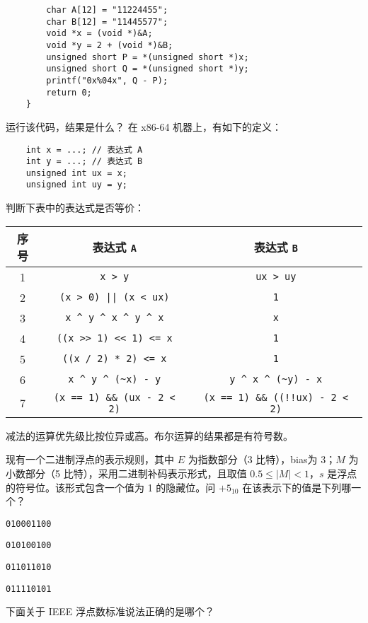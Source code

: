 \begin{problems}
\begin{verbatim}
        char A[12] = "11224455";
        char B[12] = "11445577";
        void *x = (void *)&A;
        void *y = 2 + (void *)&B;
        unsigned short P = *(unsigned short *)x;
        unsigned short Q = *(unsigned short *)y;
        printf("0x%04x", Q - P);
        return 0;
    }
		\end{verbatim}
		运行该代码，结果是什么？
		\pro 在 x86-64 机器上，有如下的定义：
		\begin{verbatim}
    int x = ...; // 表达式 A
    int y = ...; // 表达式 B
    unsigned int ux = x;
    unsigned int uy = y;
		\end{verbatim}
		判断下表中的表达式是否等价：
		\begin{table}[H]
			\centering
			\begin{tabular}{|c|c|c|}
				\hline
				序号 & 表达式 \verb|A| & 表达式 \verb|B| \\ \hline
				1 & \verb|x > y| & \verb|ux > uy| \\ \hline
				2 & \verb+(x > 0) || (x < ux)+ & \verb|1| \\ \hline
				3 & \verb|x ^ y ^ x ^ y ^ x| & \verb|x| \\ \hline
				4 & \verb|((x >> 1) << 1) <= x| & \verb|1| \\ \hline
				5 & \verb|((x / 2) * 2) <= x| & \verb|1| \\ \hline
				6 & \verb|x ^ y ^ (~x) - y| & \verb|y ^ x ^ (~y) - x| \\ \hline
				7 & \verb|(x == 1) && (ux - 2 < 2)| & \verb|(x == 1) && ((!!ux) - 2 < 2)| \\ \hline
			\end{tabular}
		\end{table}
		\begin{hint}
			减法的运算优先级比按位异或高。布尔运算的结果都是有符号数。
		\end{hint}
		\pro 现有一个二进制浮点的表示规则，其中 $E$ 为指数部分（3 比特），bias为 3；$M$ 为小数部分（5 比特），采用二进制补码表示形式，且取值 $0.5 \leq |M|<1$，$s$ 是浮点的符号位。该形式包含一个值为 1 的隐藏位。问 $+5_{10}$ 在该表示下的值是下列哪一个？
		\begin{choices}
			\item \texttt{010001100}
			\item \texttt{010100100}
			\item \texttt{011011010}
			\item \texttt{011110101}
		\end{choices}
        \pro 下面关于 IEEE 浮点数标准说法正确的是哪个？

\end{problems}
